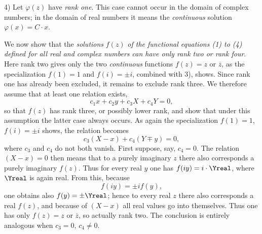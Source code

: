 \documentclass[11pt]{article}
\begin{document}
4) Let \(\varphi(z)\) have \emph{rank one}. This case cannot occur in the domain of complex numbers; in the domain of real numbers it means the \emph{continuous} solution \(\varphi(x)=C\cdot x\).

We now show that the \emph{solutions} \(f(z)\) \emph{of the functional equations (1) to (4) defined for all real and complex numbers can have only rank two or rank four}. Here rank two gives only the two \emph{continuous} functions \(f(z)=z\) or \(\overline z\), as the specialization \(f(1)=1\) and \(f(i)=\pm i\), combined with 3), shows. Since rank one has already been excluded, it remains to exclude rank three. We therefore assume that at least one relation exists,
\[
c_1x+c_2y+c_3X+c_4Y=0,
\]
so that \(f(z)\) has rank three, or possibly lower rank, and show that under this assumption the latter case always occurs. As again the specialization \(f(1)=1\), \(f(i)=\pm i\) shows, the relation becomes
\[
c_3(X-x)+c_4(Y\mp y)=0,
\]
where \(c_3\) and \(c_4\) do not both vanish. First suppose, say, \(c_4=0\). The relation \((X-x)=0\) then means that to a purely imaginary \(z\) there also corresponds a purely imaginary \(f(z)\). Thus for every real \(y\) one has \(f(iy)=i\cdot\Yreal\), where \(\Yreal\) is again real. From this, because
\[
f(iy)=\pm i f(y),
\]
one obtains also \(f(y)=\pm\Yreal\); hence to every real \(z\) there also corresponds a real \(f(z)\), and because of \((X-x)\) all real values go into themselves. Thus one has only \(f(z)=z\) or \(\overline z\), so actually rank two. The conclusion is entirely analogous when \(c_3=0\), \(c_4\ne0\).
\end{document}
